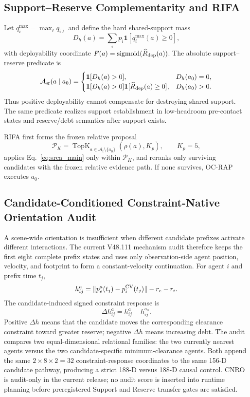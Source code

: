 \documentclass[conference]{IEEEtran}
\DeclareMathOperator{\sigmoid}{sigmoid}
\DeclareMathOperator{\TopK}{TopK}
\newcommand{\cA}{\mathcal{A}}
\newcommand{\cP}{\mathcal{P}}
\begin{document}
\subsection{Support--Reserve Complementarity and RIFA}
Let $q_i^{\max}=\max_\ell q_{i\ell}$ and define the hard shared-support mass
\begin{equation}
 D_h(a)=\sum_i p_i\mathbf 1[q_i^{\max}(a)\ge0],
\end{equation}
with deployability coordinate $F(a)=\sigmoid(\widehat R_{\rm dep}(a))$. The absolute support--reserve predicate is
\begin{equation}
 \mathcal A_{\rm sr}(a\mid a_0)=
 \begin{cases}
 \mathbf 1[D_h(a)>0], & D_h(a_0)=0,\\
 \mathbf 1[D_h(a)>0]\mathbf 1[\widehat R_{\rm dep}(a)\ge0], & D_h(a_0)>0.
 \end{cases}
 \label{eq:srca_main}
\end{equation}
Thus positive deployability cannot compensate for destroying shared support. The same predicate realizes support establishment in low-headroom pre-contact states and reserve/debt semantics after support exists.

RIFA first forms the frozen relative proposal
\begin{equation}
 \cP_K=\TopK_{a\in\cA_t\setminus\{a_0\}}(\rho(a),K_p),\qquad K_p=5,
\end{equation}
applies Eq.~\eqref{eq:srca_main} only within $\cP_K$, and reranks only surviving candidates with the frozen relative evidence path. If none survives, OC-RAP executes $a_0$.

\subsection{Candidate-Conditioned Constraint-Native Orientation Audit}
\label{subsec:cnro_main}
A scene-wide orientation is insufficient when different candidate prefixes activate different interactions. The current V48.111 mechanism audit therefore keeps the first eight complete prefix states and uses only observation-side agent position, velocity, and footprint to form a constant-velocity continuation. For agent $i$ and prefix time $t_j$,
\begin{equation}
 h_{ij}^{a}=\|p_e^{a}(t_j)-p_i^{\rm CV}(t_j)\|-r_e-r_i.
\end{equation}
The candidate-induced signed constraint response is
\begin{equation}
 \Delta h_{ij}^{a}=h_{ij}^{a}-h_{ij}^{a_0}.
 \label{eq:delta_h_main}
\end{equation}
Positive $\Delta h$ means that the candidate moves the corresponding clearance constraint toward greater reserve; negative $\Delta h$ means increasing debt. The audit compares two equal-dimensional relational families: the two currently nearest agents versus the two candidate-specific minimum-clearance agents. Both append the same $2\times8\times2=32$ constraint-response coordinates to the same 156-D candidate pathway, producing a strict 188-D versus 188-D causal control. CNRO is audit-only in the current release; no audit score is inserted into runtime planning before preregistered Support and Reserve transfer gates are satisfied.
\end{document}
